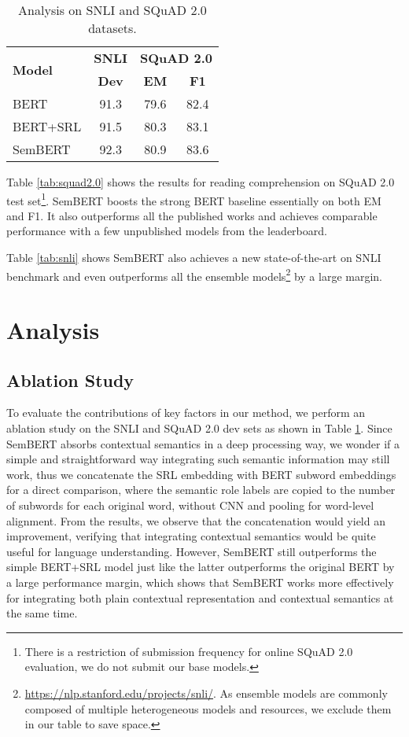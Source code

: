 \documentclass[letterpaper]{article} \usepackage{aaai20}  \usepackage{times}  \usepackage{helvet} \usepackage{courier}  \usepackage[hyphens]{url}  \usepackage{graphicx} \urlstyle{rm} \def\UrlFont{\rm}  \usepackage{graphicx}  \frenchspacing  \usepackage{amssymb}
\begin{document}
	\begin{table}
		\centering

		{
			\begin{tabular}{l c c c}
				\hline
				
				\hline
				\multirow{2}{*}{\textbf{Model}} &\textbf{SNLI} &\multicolumn{2}{c}{\textbf{SQuAD 2.0}} \\
				& \textbf{Dev}   &  \textbf{EM} & \textbf{F1}\\
				\hline
				BERT & 91.3 & 79.6 & 82.4 \\
				BERT+SRL & 91.5 & 80.3 & 83.1 \\ 
				SemBERT &  92.3  & 80.9 & 83.6 \\    
				\hline
			\end{tabular}
		}

		\caption{\label{tab:ablation} Analysis on SNLI and SQuAD 2.0 datasets.}
	\end{table}
Table \ref{tab:squad2.0} shows the results for reading comprehension on SQuAD 2.0 test set\footnote[9]{There is a restriction of submission frequency for online SQuAD 2.0 evaluation, we do not submit our base models.}. SemBERT boosts the strong BERT baseline essentially on both EM and F1. It also outperforms all the published works and achieves comparable performance with a few unpublished models from the leaderboard. 

	
Table \ref{tab:snli} shows SemBERT also achieves a new state-of-the-art on SNLI benchmark and even outperforms all the ensemble models\footnote[10]{\url{https://nlp.stanford.edu/projects/snli/}. As ensemble models are commonly composed of multiple heterogeneous models and resources, we exclude them in our table to save space.} by a large margin. 



\section{Analysis}\label{sec:ana}
\subsection{Ablation Study}
To evaluate the contributions of key factors in our method, we perform an ablation study on the SNLI and SQuAD 2.0 dev sets as shown in Table \ref{tab:ablation}. Since SemBERT absorbs contextual semantics in a deep processing way, we wonder if a simple and straightforward way integrating such semantic information may still work, thus we concatenate the SRL embedding with BERT subword embeddings for a direct comparison, where the semantic role labels are copied to the number of subwords for each original word, without CNN and pooling for word-level alignment. From the results, we observe that the concatenation would yield an improvement, verifying that integrating contextual semantics would be quite useful for language understanding. However, SemBERT still outperforms the simple BERT+SRL model just like the latter outperforms the original BERT by a large performance margin, which shows that SemBERT works more effectively for integrating both plain contextual representation and contextual semantics at the same time. 
\end{document}
